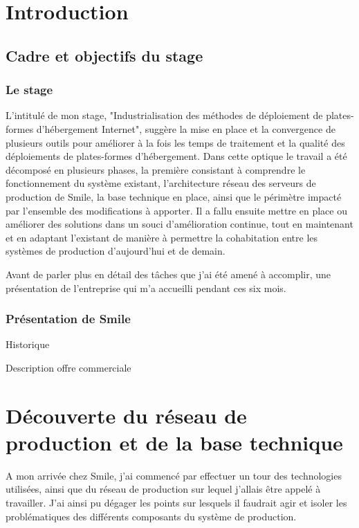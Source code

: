 \documentclass[14 pt]{extreport}
\begin{document}
\chapter{Introduction}

\section{Cadre et objectifs du stage}

\subsection{Le stage}L'intitulé de mon stage, "Industrialisation des méthodes de déploiement de plates-formes d'hébergement Internet", suggère la mise en place et la convergence de plusieurs outils pour améliorer à la fois les temps de traitement et la qualité des déploiements de plates-formes d'hébergement. Dans cette optique le travail a été décomposé en plusieurs phases, la première consistant à comprendre le fonctionnement du système existant, l'architecture réseau des serveurs de production de Smile, la base technique en place, ainsi que le périmètre impacté par l'ensemble des modifications à apporter. Il a fallu ensuite mettre en place ou améliorer des solutions dans un souci d'amélioration continue, tout en maintenant et en adaptant l'existant de manière à permettre la cohabitation entre les systèmes de production d'aujourd'hui et de demain.

Avant de parler plus en détail des tâches que j'ai été amené à accomplir, une présentation de l'entreprise qui m'a accueilli pendant ces six mois.

\subsection{Présentation de Smile}
\lipsum
Historique

Description offre commerciale

\chapter{Découverte du réseau de production et de la base technique}

A mon arrivée chez Smile, j'ai commencé par effectuer un tour des technologies utilisées, ainsi que du réseau de production sur lequel j'allais être appelé à travailler. J'ai ainsi pu dégager les points sur lesquels il faudrait agir et isoler les problématiques des différents composants du système de production.
\end{document}
